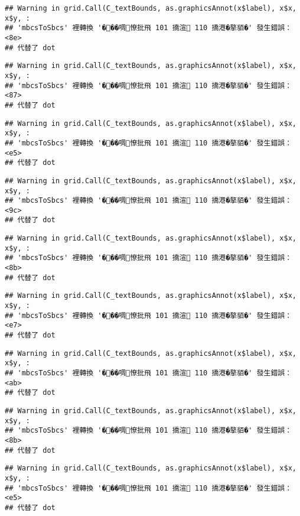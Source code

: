 \documentclass[
]{article}
\begin{document}
\begin{verbatim}
## Warning in grid.Call(C_textBounds, as.graphicsAnnot(x$label), x$x, x$y, :
## 'mbcsToSbcs' 裡轉換 '���啁憭批飛 101 撟渲 110 撟港�摮貊�' 發生錯誤：<8e>
## 代替了 dot
\end{verbatim}

\begin{verbatim}
## Warning in grid.Call(C_textBounds, as.graphicsAnnot(x$label), x$x, x$y, :
## 'mbcsToSbcs' 裡轉換 '���啁憭批飛 101 撟渲 110 撟港�摮貊�' 發生錯誤：<87>
## 代替了 dot
\end{verbatim}

\begin{verbatim}
## Warning in grid.Call(C_textBounds, as.graphicsAnnot(x$label), x$x, x$y, :
## 'mbcsToSbcs' 裡轉換 '���啁憭批飛 101 撟渲 110 撟港�摮貊�' 發生錯誤：<e5>
## 代替了 dot
\end{verbatim}

\begin{verbatim}
## Warning in grid.Call(C_textBounds, as.graphicsAnnot(x$label), x$x, x$y, :
## 'mbcsToSbcs' 裡轉換 '���啁憭批飛 101 撟渲 110 撟港�摮貊�' 發生錯誤：<9c>
## 代替了 dot
\end{verbatim}

\begin{verbatim}
## Warning in grid.Call(C_textBounds, as.graphicsAnnot(x$label), x$x, x$y, :
## 'mbcsToSbcs' 裡轉換 '���啁憭批飛 101 撟渲 110 撟港�摮貊�' 發生錯誤：<8b>
## 代替了 dot
\end{verbatim}

\begin{verbatim}
## Warning in grid.Call(C_textBounds, as.graphicsAnnot(x$label), x$x, x$y, :
## 'mbcsToSbcs' 裡轉換 '���啁憭批飛 101 撟渲 110 撟港�摮貊�' 發生錯誤：<e7>
## 代替了 dot
\end{verbatim}

\begin{verbatim}
## Warning in grid.Call(C_textBounds, as.graphicsAnnot(x$label), x$x, x$y, :
## 'mbcsToSbcs' 裡轉換 '���啁憭批飛 101 撟渲 110 撟港�摮貊�' 發生錯誤：<ab>
## 代替了 dot
\end{verbatim}

\begin{verbatim}
## Warning in grid.Call(C_textBounds, as.graphicsAnnot(x$label), x$x, x$y, :
## 'mbcsToSbcs' 裡轉換 '���啁憭批飛 101 撟渲 110 撟港�摮貊�' 發生錯誤：<8b>
## 代替了 dot
\end{verbatim}

\begin{verbatim}
## Warning in grid.Call(C_textBounds, as.graphicsAnnot(x$label), x$x, x$y, :
## 'mbcsToSbcs' 裡轉換 '���啁憭批飛 101 撟渲 110 撟港�摮貊�' 發生錯誤：<e5>
## 代替了 dot
\end{verbatim}
\end{document}
